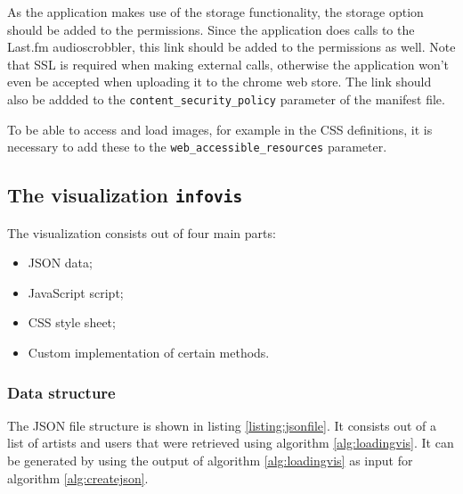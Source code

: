 As the application makes use of the storage functionality, the storage option should be added to the permissions. Since the application does calls to the Last.fm audioscrobbler, this link should be added to the permissions as well. Note that SSL is required when making external calls, otherwise the application won't even be accepted when uploading it to the chrome web store. The link should also be addded to the \texttt{content\_security\_policy} parameter of the manifest file.

To be able to access and load images, for example in the CSS definitions, it is necessary to add these to the \texttt{web\_accessible\_resources} parameter.

\subsection{The visualization \texttt{infovis}}\label{chapter:implementation:section:implementation:subsection:whitebox}

The visualization consists out of four main parts:

\begin{itemize}
	\item JSON data;
	\item JavaScript script;
	\item CSS style sheet;
	\item Custom implementation of certain methods.
\end{itemize}

\subsubsection{Data structure}

The JSON file structure is shown in listing \ref{listing:jsonfile}. It consists out of a list of artists and users that were retrieved using algorithm \ref{alg:loadingvis}. It can be generated by using the output of algorithm \ref{alg:loadingvis} as input for algorithm \ref{alg:createjson}.



%

